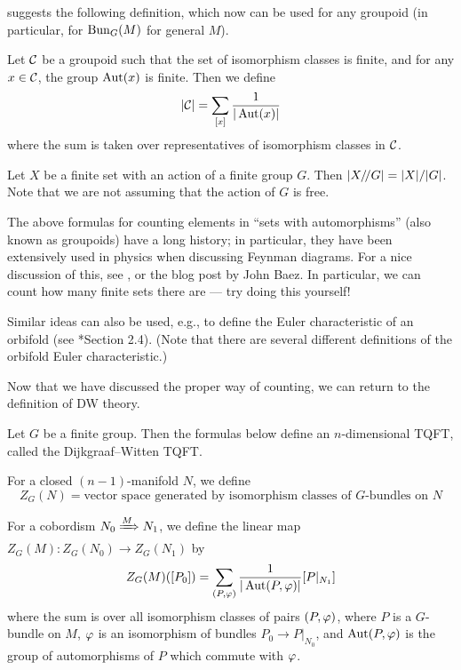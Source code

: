  suggests the following definition, which now
can be used for any groupoid (in particular, for $\operatorname{Bun}_G(M)$ for general $M$).
\begin{definition}\label{d:count}
  Let $\mathcal{C}$ be a groupoid such that the set of isomorphism classes is finite,
  and for any $x\in \mathcal{C}$, the group
  $\operatorname{Aut}(x)$ is finite. Then we define
  $$
  |\mathcal{C}|=\sum_{[x]} \frac{1}{|\operatorname{Aut}(x)|}
  $$
  where the sum is taken over representatives of isomorphism classes in $\mathcal{C}$.
\end{definition}
\begin{example}\label{x:action-groupoid}
  Let $X$ be a finite set with an action of a finite group $G$.
  Then $|X/ \! / G|=|X|/|G|$. Note that we are not assuming that the
  action of $G$ is free.
\end{example}
The above formulas for counting elements in ``sets with automorphisms'' (also
known as groupoids) have a long history; in particular, they have been
extensively used in physics when discussing Feynman diagrams. For a nice
discussion of this, see , or the blog post
 by John Baez. In particular, we can count how many finite
sets there are --- try doing this yourself!


Similar ideas can also be used, e.g., to define the Euler characteristic of
an orbifold (see *{Section 2.4}). (Note that there are several
different definitions of the orbifold Euler characteristic.)

Now that we have discussed the proper way of counting, we can return to the
definition of DW theory.

\begin{theorem}\label{t:DW}
  Let $G$ be a finite group. Then the formulas below define an
  $n$-dimensional TQFT, called the Dijkgraaf--Witten TQFT.

  For a closed $(n-1)$-manifold $N$, we define
  $$
    Z_G(N)=\text{vector space generated by isomorphism classes of
                  $G$-bundles on $N$}
  $$

  For a cobordism $N_0\xRightarrow{M}N_1$, we define the linear map
  $Z_G(M)\colon Z_G(N_0)\to Z_G(N_1)$ by
  \begin{equation}\label{e:DWmain}
    Z_G(M)([P_0])=\sum_{(P, \varphi)} \frac{1}{|\operatorname{Aut}(P,\varphi)|} [P|_{N_1}]
  \end{equation}
  where the sum is over all isomorphism classes of pairs $(P, \varphi)$, where
  $P$ is a $G$-bundle on $M$, $\varphi$ is an isomorphism of
  bundles $P_0\to P|_{N_0}$, and $\operatorname{Aut}(P, \varphi)$ is the group of
  automorphisms of $P$ which commute with $\varphi$.
\end{theorem}

